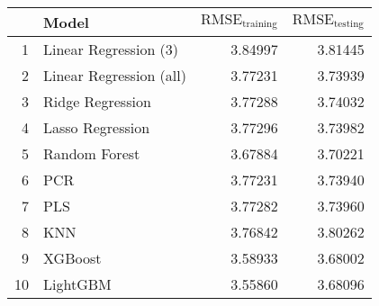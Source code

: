 \begin{table}[ht]
\centering 
\begin{tabular}{rlrr}
  \hline
 & Model & $\text{RMSE}_{\text{training}}$ & $\text{RMSE}_{\text{testing}}$ \\ 
  \hline
1 & Linear Regression (3) & 3.84997 & 3.81445 \\ 
  2 & Linear Regression (all) & 3.77231 & 3.73939 \\ 
  3 & Ridge Regression & 3.77288 & 3.74032 \\ 
  4 & Lasso Regression & 3.77296 & 3.73982 \\ 
  5 & Random Forest & 3.67884 & 3.70221 \\ 
  6 & PCR & 3.77231 & 3.73940 \\ 
  7 & PLS & 3.77282 & 3.73960 \\ 
  8 & KNN & 3.76842 & 3.80262 \\ 
  9 & XGBoost & 3.58933 & 3.68002 \\ 
  10 & LightGBM & 3.55860 & 3.68096 \\ 
   \hline
\end{tabular}
\end{table}
